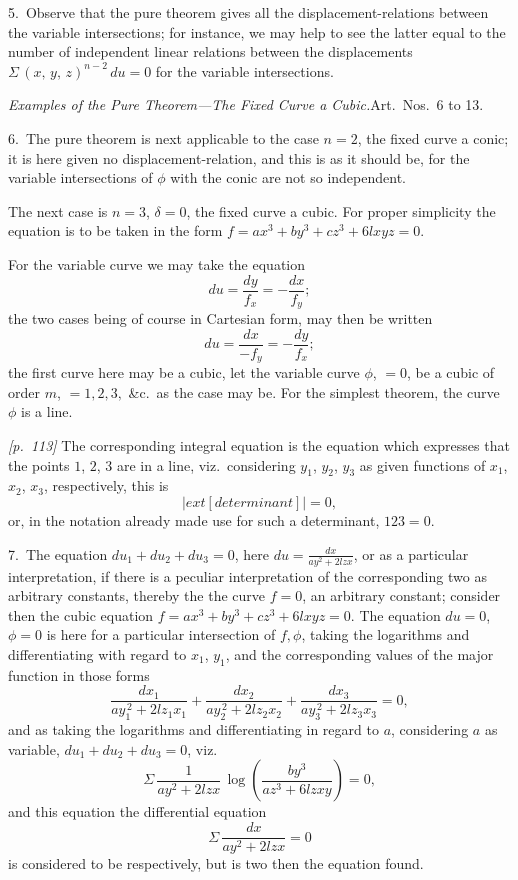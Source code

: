 \documentclass[11pt,a4paper]{book}
\begin{document}
5.\ Observe that the pure theorem gives all the displacement-relations between the variable intersections; for instance, we may help to see the latter equal to the number of independent linear relations between the displacements $\Sigma\,(x,\,y,\,z)^{n-2}\,du = 0$ for the variable intersections.

\textit{Examples of the Pure Theorem---The Fixed Curve a Cubic.}\quad Art.\ Nos.\ 6 to 13.

6.\ The pure theorem is next applicable to the case $n = 2$, the fixed curve a conic; it is here given no displacement-relation, and this is as it should be, for the variable intersections of $\phi$ with the conic are not so independent.

The next case is $n = 3$, $\delta = 0$, the fixed curve a cubic. For proper simplicity the equation is to be taken in the form $f = ax^3 + by^3 + cz^3 + 6lxyz = 0$.

For the variable curve we may take the equation
\[
du = \frac{dy}{f_x} = -\frac{dx}{f_y};
\]
the two cases being of course in Cartesian form, may then be written
\[
du = \frac{dx}{-f_y} = -\frac{dy}{f_x};
\]
the first curve here may be a cubic, let the variable curve $\phi$, $= 0$, be a cubic of order $m$, $= 1, 2, 3,$ \&c.\ as the case may be. For the simplest theorem, the curve $\phi$ is a line.

\noindent\textit{[p.~113]} The corresponding integral equation is the equation which expresses that the points $1$, $2$, $3$ are in a line, viz.\ considering $y_1$, $y_2$, $y_3$ as given functions of $x_1$, $x_2$, $x_3$, respectively, this is
\[
\left|
	ext{[determinant]}
\right| = 0,
\]
or, in the notation already made use for such a determinant, $123 = 0$.

\bigskip

7.\ The equation $du_1 + du_2 + du_3 = 0$, here $du = \frac{dx}{ay^2 + 2lzx}$, or as a particular interpretation, if there is a peculiar interpretation of the corresponding two as arbitrary constants, thereby the the curve $f = 0$, an arbitrary constant; consider then the cubic equation $f = ax^3 + by^3 + cz^3 + 6lxyz = 0$. The equation $du = 0$, $\phi = 0$ is here for a particular intersection of $f, \phi$, taking the logarithms and differentiating with regard to $x_1$, $y_1$, and the corresponding values of the major function in those forms
\[
\frac{dx_1}{ay_1^{\,2} + 2lz_1x_1} + \frac{dx_2}{ay_2^{\,2} + 2lz_2x_2} + \frac{dx_3}{ay_3^{\,2} + 2lz_3x_3} = 0,
\]
and as taking the logarithms and differentiating in regard to $a$, considering $a$ as variable, $du_1 + du_2 + du_3 = 0$, viz.
\[
\Sigma\,\frac{1}{ay^2 + 2lzx}\,\log\!\left(\frac{by^3}{az^3 + 6lzxy}\right) = 0,
\]
and this equation the differential equation
\[
\Sigma\,\frac{dx}{ay^2 + 2lzx} = 0
\]
is considered to be respectively, but is two then the equation found.
\end{document}
